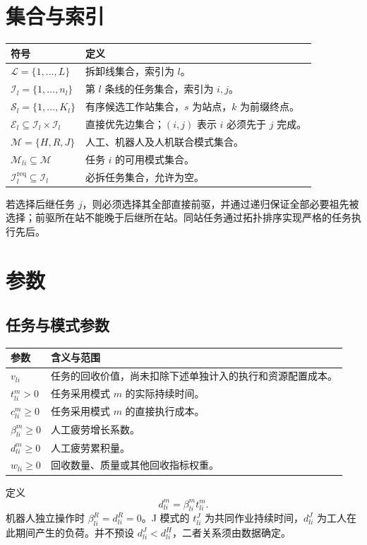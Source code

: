 \documentclass[UTF8,a4paper,11pt]{ctexart}
\begin{document}
\section{集合与索引}
\begin{longtable}{p{}p{}}
\toprule 符号 & 定义\\\midrule
$\mathcal L=\{1,\ldots,L\}$ & 拆卸线集合，索引为 $l$。\\
$\mathcal I_l=\{1,\ldots,n_l\}$ & 第 $l$ 条线的任务集合，索引为 $i,j$。\\
$\mathcal S_l=\{1,\ldots,K_l\}$ & 有序候选工作站集合，$s$ 为站点，$k$ 为前缀终点。\\
$\mathcal E_l\subseteq\mathcal I_l\times\mathcal I_l$ & 直接优先边集合；$(i,j)$ 表示 $i$ 必须先于 $j$ 完成。\\
$\mathcal M=\{H,R,J\}$ & 人工、机器人及人机联合模式集合。\\
$\mathcal M_{li}\subseteq\mathcal M$ & 任务 $i$ 的可用模式集合。\\
$\mathcal I_l^{\mathrm{req}}\subseteq\mathcal I_l$ & 必拆任务集合，允许为空。\\\bottomrule
\end{longtable}
若选择后继任务 $j$，则必须选择其全部直接前驱，并通过递归保证全部必要祖先被选择；前驱所在站不能晚于后继所在站。同站任务通过拓扑排序实现严格的任务执行先后。

\section{参数}
\subsection{任务与模式参数}
\begin{longtable}{p{}p{}}
\toprule 参数 & 含义与范围\\\midrule
$v_{li}$ & 任务的回收价值，尚未扣除下述单独计入的执行和资源配置成本。\\
$t_{li}^{m}>0$ & 任务采用模式 $m$ 的实际持续时间。\\
$c_{li}^{m}\geq0$ & 任务采用模式 $m$ 的直接执行成本。\\
$\beta_{li}^{m}\geq0$ & 人工疲劳增长系数。\\
$d_{li}^{m}\geq0$ & 人工疲劳累积量。\\
$w_{li}\geq0$ & 回收数量、质量或其他回收指标权重。\\\bottomrule
\end{longtable}
定义
\begin{equation}
d_{li}^{m}=\beta_{li}^{m}t_{li}^{m}.\tag{1}
\end{equation}
机器人独立操作时 $\beta_{li}^{R}=d_{li}^{R}=0$。J 模式的 $t_{li}^{J}$ 为共同作业持续时间，$d_{li}^{J}$ 为工人在此期间产生的负荷。并不预设 $d_{li}^{J}<d_{li}^{H}$，二者关系须由数据确定。
\end{document}
